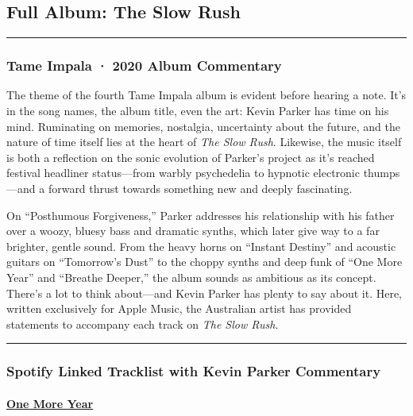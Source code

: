 \documentclass[
]{article}
\begin{document}
\subsection{\texorpdfstring{\textbf{Full Album}: The Slow
Rush}{Full Album: The Slow Rush}}\label{full-album-the-slow-rush}

\begin{center}\rule{0.5\linewidth}{0.5pt}\end{center}

\subsubsection{Tame Impala · 2020 Album
Commentary}\label{tame-impala-2020-album-commentary}

The theme of the fourth Tame Impala album is evident before hearing a
note. It's in the song names, the album title, even the art: Kevin
Parker has time on his mind. Ruminating on memories, nostalgia,
uncertainty about the future, and the nature of time itself lies at the
heart of \emph{The Slow Rush}. Likewise, the music itself is both a
reflection on the sonic evolution of Parker's project as it's reached
festival headliner status---from warbly psychedelia to hypnotic
electronic thumps---and a forward thrust towards something new and
deeply fascinating.

On ``Posthumous Forgiveness,'' Parker addresses his relationship with
his father over a woozy, bluesy bass and dramatic synths, which later
give way to a far brighter, gentle sound. From the heavy horns on
``Instant Destiny'' and acoustic guitars on ``Tomorrow's Dust'' to the
choppy synths and deep funk of ``One More Year'' and ``Breathe Deeper,''
the album sounds as ambitious as its concept. There's a lot to think
about---and Kevin Parker has plenty to say about it. Here, written
exclusively for Apple Music, the Australian artist has provided
statements to accompany each track on \emph{The Slow Rush}.

\begin{center}\rule{0.5\linewidth}{0.5pt}\end{center}

\subsubsection{Spotify Linked Tracklist with Kevin Parker
Commentary}\label{spotify-linked-tracklist-with-kevin-parker-commentary}

\paragraph{\texorpdfstring{\href{https://open.spotify.com/track/5ozqshq2dtU7SYCpCBu0NE?si=27296a518bf241d9}{\textbf{One
More Year}}}{One More Year}}\label{one-more-year}
\end{document}
